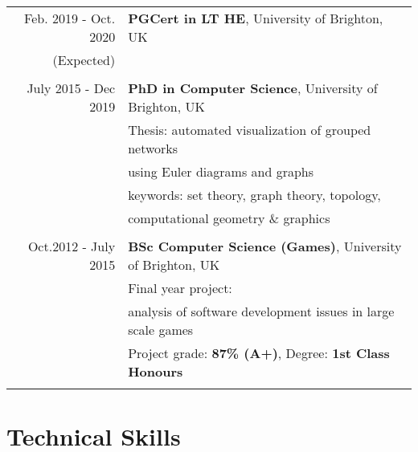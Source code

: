 \documentclass[a4paper,11pt]{article} %
\begin{document}
\begin{tabular}{r|p{11cm}}

Feb. 2019 - Oct. 2020 & \textbf{PGCert in LT HE}, University of Brighton, UK\\
(Expected)&\\
\multicolumn{2}{c}{} \\


July 2015 - Dec 2019 & \textbf{PhD in Computer Science}, University of Brighton, UK\\
& Thesis: automated visualization of grouped networks\\
& using Euler diagrams and graphs\\
& keywords: set theory, graph theory, topology,\\
& computational geometry \& graphics \\
\multicolumn{2}{c}{} \\

	
Oct.2012 - July 2015 & \textbf{BSc Computer Science (Games)}, University of Brighton, UK\\
& Final year project: \\
& analysis of software development issues in large scale games\\
&\normalsize Project grade: \textbf{87\% (A+)}, Degree: \textbf{1st Class Honours} \\
\multicolumn{2}{c}{} \\

\end{tabular}








\section{Technical Skills}
\end{document}
